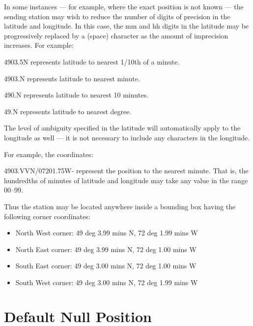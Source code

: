 In some instances — for example, where the exact position is not known —
the sending station may wish to reduce the number of digits of precision in
the latitude and longitude. In this case, the mm and hh digits in the latitude
may be progressively replaced by a \textvisiblespace (space) character as the amount of
imprecision increases. For example:

\begin{description}
 
\item 4903.5\textvisiblespace N represents latitude to nearest 1/10th of a minute.
\item 4903.\textvisiblespace\textvisiblespace N represents latitude to nearest minute.
\item 490\textvisiblespace.\textvisiblespace\textvisiblespace N represents latitude to nearest 10 minutes.
\item 49\textvisiblespace\textvisiblespace.\textvisiblespace\textvisiblespace N represents latitude to nearest degree.
\end{description}

The level of ambiguity specified in the latitude will automatically
apply to the longitude as well — it is not necessary to include
any \textvisiblespace characters in the longitude.

For example, the coordinates:

4903.VVN/07201.75W- represent the position to the nearest minute. That
is, the hundredths of minutes of latitude and longitude may take any
value in the range 00–99.

Thus the station may be located anywhere inside a bounding box having the
following corner coordinates:

\begin{itemize}

\item North West corner: 49 deg 3.99 mins N, 72 deg 1.99 mins W
\item North East corner: 49 deg 3.99 mins N, 72 deg 1.00 mins W
\item South East corner: 49 deg 3.00 mins N, 72 deg 1.00 mins W
\item South West corner: 49 deg 3.00 mins N, 72 deg 1.99 mins W

\end{itemize}

\section{Default Null Position}

